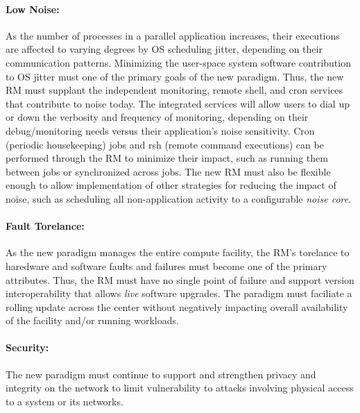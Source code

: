 \documentclass{article}
\newcommand{\ngrm}{NGRM}
\begin{document}
\paragraph{Low Noise:}
As the number of processes in a parallel application increases, 
their executions are affected to varying degrees by OS
scheduling jitter, depending on their communication patterns. Minimizing
the user-space system software contribution to OS jitter must one 
of the primary goals of the new paradigm.  Thus, the new RM must supplant
the independent monitoring, remote shell, and cron
services that contribute to noise today. The integrated services will
allow users to dial up or down the verbosity and frequency of monitoring,
depending on their debug/monitoring needs versus their application's noise
sensitivity. Cron (periodic housekeeping) jobs and rsh (remote command
executions) can be performed through the RM to minimize their impact,
such as running them between jobs or synchronized across jobs. 
The new RM must also be flexible enough to allow implementation of other
strategies for reducing the impact of noise, such as scheduling all
non-application activity to a configurable {\em noise core}.


\paragraph{Fault Torelance:}
As the new paradigm manages the entire compute facility,
the RM's torelance to haredware and software faults and failures
must become one of the primary attributes.
Thus, the RM must have no single point of failure and support
version interoperability that allows {\em live} software upgrades.
The paradigm must faciliate a rolling update across the center
without negatively impacting overall availability of 
the facility and/or running workloads.


\paragraph{Security:}
The new paradigm must continue to support and strengthen privacy 
and integrity on
the network to limit vulnerability to attacks involving physical access
to a system or its networks.

%
\end{document}
